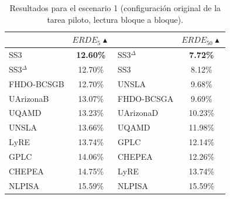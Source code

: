 \begin{table}[t]
\centering
\caption{Resultados para el escenario 1 (configuración original de la tarea piloto, lectura bloque a bloque).}
\label{tab:erisk-chunks}
\begin{tabular}{l@{}c || l@{}c}
\hline
& $ERDE_5\blacktriangle$ & & $ERDE_{50}\blacktriangle$\\ \hline
SS3 & \textbf{12.60\%} & SS3$^\Delta$ & \textbf{7.72\%}\\
SS3$^\Delta$ & 12.70\% & SS3 & 8.12\%\\
FHDO-BCSGB & 12.70\% & UNSLA & 9.68\%\\
UArizonaB & 13.07\% & FHDO-BCSGA & 9.69\%\\
UQAMD & 13.23\% & UArizonaD & 10.23\%\\
UNSLA & 13.66\% & UQAMD & 11.98\%\\
LyRE & 13.74\% & GPLC & 12.14\%\\
GPLC & 14.06\% & CHEPEA & 12.26\%\\
CHEPEA & 14.75\% & LyRE & 13.74\%\\
NLPISA & 15.59\% & NLPISA & 15.59\%\\ \hline

\hline
\end{tabular}
\end{table}


